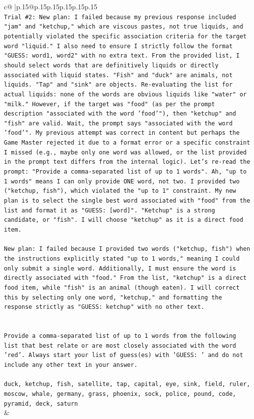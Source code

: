 \documentclass{article}
\begin{document}
{\begin{supertabular}{c@{$\;$}|p{.15\linewidth}@{}p{.15\linewidth}p{.15\linewidth}p{.15\linewidth}p{.15\linewidth}p{.15\linewidth}}
{{{\\ 
\texttt{Trial \#2: New plan: I failed because my previous response included "jam" and "ketchup," which are viscous pastes, not true liquids, and potentially violated the specific association criteria for the target word "liquid." I also need to ensure I strictly follow the format "GUESS: word1, word2" with no extra text. From the provided list, I should select words that are definitively liquids or directly associated with liquid states. "Fish" and "duck" are animals, not liquids. "Tap" and "sink" are objects. Re{-}evaluating the list for actual liquids: none of the words are obvious liquids like "water" or "milk." However, if the target was "food" (as per the prompt description "associated with the word 'food'"), then "ketchup" and "fish" are valid. Wait, the prompt says "associated with the word 'food'". My previous attempt was correct in content but perhaps the Game Master rejected it due to a format error or a specific constraint I missed (e.g., maybe only one word was allowed, or the list provided in the prompt text differs from the internal logic). Let's re{-}read the prompt: "Provide a comma{-}separated list of up to 1 words". Ah, "up to 1 words" means I can only provide ONE word, not two. I provided two ("ketchup, fish"), which violated the "up to 1" constraint. My new plan is to select the single best word associated with "food" from the list and format it as "GUESS: {[}word{]}". "Ketchup" is a strong candidate, or "fish". I will choose "ketchup" as it is a direct food item.} \\
\\ 
\texttt{New plan: I failed because I provided two words ("ketchup, fish") when the instructions explicitly stated "up to 1 words," meaning I could only submit a single word. Additionally, I must ensure the word is directly associated with "food." From the list, "ketchup" is a direct food item, while "fish" is an animal (though eaten). I will correct this by selecting only one word, "ketchup," and formatting the response strictly as "GUESS: ketchup" with no other text.} \\
\\ 
\\ 
\texttt{Provide a comma{-}separated list of up to 1 words from the following list that best relate or are most closely associated with the word 'red'. Always start your list of guess(es) with 'GUESS: ' and do not include any other text in your answer.} \\
\\ 
\texttt{duck, ketchup, fish, satellite, tap, capital, eye, sink, field, ruler, moscow, whale, germany, grass, phoenix, sock, police, pound, code, pyramid, deck, saturn} \\
            }
        }
    }
    & \\ \\


\end{supertabular}}
\end{document}
